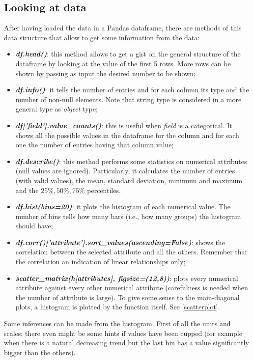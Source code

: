 \documentclass[12pt, letterpaper]{article}
\theoremstyle{definition}
\begin{document}
\subsection{Looking at data}
After having loaded the data in a Pandas dataframe, there are methods of this data structure that allow to get some information from the data:
\begin{itemize}
\item \textbf{\textit{df.head()}}: this method allows to get a gist on the general structure of the dataframe by looking at the value of the first 5 rows. More rows can be shown by passing as input the desired number to be shown;

\item \textbf{\textit{df.info()}}: it tells the number of entries and for each column its type and the number of non-null elements. Note that string type is considered in a more general type as \textit{object} type;
\item \textbf{\textit{df['field'].value\_counts()}}: this is useful when \textit{field} is a categorical. It shows all the possible values in the dataframe for the column and for each one the number of entries having that column value;
\item \textbf{\textit{df.describe()}}: this method performs some statistics on numerical attributes (null values are ignored). Particularly, it calculates the number of entries (with valid values), the mean, standard deviation, minimum and maximum and the $25\%, 50\%, 75\%$ percentiles.
\item\textbf{\textit{df.hist(bins=20)}}: it plots the histogram of each numerical value. The number of bins tells how many bars (i.e., how many groups) the histogram should have;
\item\textbf{\textit{df.corr()['attribute'].sort\_values(ascending=False)}}: shows the correlation between the selected attribute and all the others. Remember that the correlation an indication of linear relationships only;
\item\textbf{\textit{scatter\_matrix(h[attributes], figsize=(12,8))}}: plots every numerical attribute against every other numerical attribute (carefulness is needed when the number of attribute is large). To give some sense to the main-diagonal plots, a histogram is plotted by the function itself. See \autoref{scatterplot}.
\end{itemize}

Some inferences can be made from the histogram. First of all the units and scales; there even might be some hints if values have been cupped (for example when there is a natural decreasing trend but the last bin has a value significantly bigger than the others).
\end{document}
